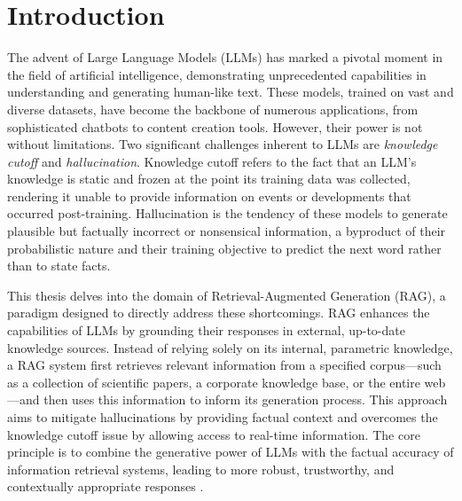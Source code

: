 \chapter{Introduction}
\label{chap:introduction}

The advent of Large Language Models (LLMs) has marked a pivotal moment in the field of artificial intelligence, demonstrating unprecedented capabilities in understanding and generating human-like text. These models, trained on vast and diverse datasets, have become the backbone of numerous applications, from sophisticated chatbots to content creation tools. However, their power is not without limitations. Two significant challenges inherent to LLMs are \textit{knowledge cutoff} and \textit{hallucination}. Knowledge cutoff refers to the fact that an LLM's knowledge is static and frozen at the point its training data was collected, rendering it unable to provide information on events or developments that occurred post-training. Hallucination is the tendency of these models to generate plausible but factually incorrect or nonsensical information, a byproduct of their probabilistic nature and their training objective to predict the next word rather than to state facts.

This thesis delves into the domain of Retrieval-Augmented Generation (RAG), a paradigm designed to directly address these shortcomings. RAG enhances the capabilities of LLMs by grounding their responses in external, up-to-date knowledge sources. Instead of relying solely on its internal, parametric knowledge, a RAG system first retrieves relevant information from a specified corpus—such as a collection of scientific papers, a corporate knowledge base, or the entire web—and then uses this information to inform its generation process. This approach aims to mitigate hallucinations by providing factual context and overcomes the knowledge cutoff issue by allowing access to real-time information. The core principle is to combine the generative power of LLMs with the factual accuracy of information retrieval systems, leading to more robust, trustworthy, and contextually appropriate responses \autocite{rag_survey_2024_ralm}.

